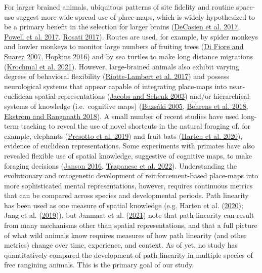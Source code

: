 \documentclass[twoside,12pt,final]{ucthesis-CA2012}
\begin{document}
\begin{ucmainmatter}
For larger brained animals, ubiquitous patterns of site fidelity and routine space-use suggest more wide-spread use of place-maps, which is widely hypothesized to be a primary benefit in the selection for larger brains (\protect\hyperlink{ref-decasien2017}{DeCasien et al. 2017}, \protect\hyperlink{ref-powell2017a}{Powell et al. 2017}, \protect\hyperlink{ref-rosati2017}{Rosati 2017}). Routes are used, for example, by spider monkeys and howler monkeys to monitor large numbers of fruiting trees (\protect\hyperlink{ref-difiore2007}{Di Fiore and Suarez 2007}, \protect\hyperlink{ref-hopkins2016}{Hopkins 2016}) and by sea turtles to make long distance migrations (\protect\hyperlink{ref-krochmal2021}{Krochmal et al. 2021}). However, large-brained animals also exhibit varying degrees of behavioral flexibility (\protect\hyperlink{ref-riotte-lambert2017}{Riotte-Lambert et al. 2017}) and possess neurological systems that appear capable of integrating place-maps into near-euclidean spatial representations (\protect\hyperlink{ref-jacobs2003}{Jacobs and Schenk 2003}) and/or hierarchical systems of knowledge (i.e.~cognitive maps) (\protect\hyperlink{ref-buzsaki2005}{Buzsáki 2005}, \protect\hyperlink{ref-behrens2018}{Behrens et al. 2018}, \protect\hyperlink{ref-ekstrom2018}{Ekstrom and Ranganath 2018}). A small number of recent studies have used long-term tracking to reveal the use of novel shortcuts in the natural foraging of, for example, elephants (\protect\hyperlink{ref-presotto2019a}{Presotto et al. 2019}) and fruit bats (\protect\hyperlink{ref-harten2020}{Harten et al. 2020}), evidence of euclidean representations. Some experiments with primates have also revealed flexible use of spatial knowledge, suggestive of cognitive maps, to make foraging decisions (\protect\hyperlink{ref-janson2016}{Janson 2016}, \protect\hyperlink{ref-trapanese2022}{Trapanese et al. 2022}). Understanding the evolutionary and ontogenetic development of reinforcement-based place-maps into more sophisticated mental representations, however, requires continuous metrics that can be compared across species and developmental periods. Path linearity has been used as one measure of spatial knowledge (e.g. Harten et al. (\protect\hyperlink{ref-harten2020}{2020}); Jang et al. (\protect\hyperlink{ref-jang2019}{2019})), but Janmaat et al. (\protect\hyperlink{ref-janmaat2021}{2021}) note that path linearity can result from many mechanisms other than spatial representations, and that a full picture of what wild animals know requires measures of how path linearity (and other metrics) change over time, experience, and context. As of yet, no study has quantitatively compared the development of path linearity in multiple species of free rangining animals. This is the primary goal of our study.


\end{ucmainmatter}
\end{document}
